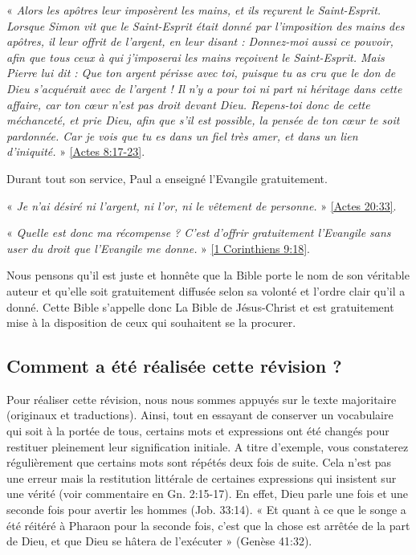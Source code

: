 \begin{small}
« \emph{Alors les apôtres leur imposèrent les mains, et ils reçurent le Saint-Esprit. Lorsque Simon vit que le Saint-Esprit était donné par l'imposition des mains des apôtres, il leur offrit de l'argent, en leur disant : Donnez-moi aussi ce pouvoir, afin que tous ceux à qui j'imposerai les mains reçoivent le Saint-Esprit. Mais Pierre lui dit : Que ton argent périsse avec toi, puisque tu as cru que le don de Dieu s'acquérait avec de l'argent ! Il n'y a pour toi ni part ni héritage dans cette affaire, car ton cœur n'est pas droit devant Dieu. Repens-toi donc de cette méchanceté, et prie Dieu, afin que s'il est possible, la pensée de ton cœur te soit pardonnée. Car je vois que tu es dans un fiel très amer, et dans un lien d'iniquité.} » \vref{Actes 8:17-23}.

Durant tout son service, Paul a enseigné l'Evangile gratuitement.

« \emph{Je n'ai désiré ni l'argent, ni l'or, ni le vêtement de personne.} » \vref{Actes 20:33}.

« \emph{Quelle est donc ma récompense ? C'est d'offrir gratuitement l'Evangile sans user du droit que l'Evangile me donne.} » \vref{1 Corinthiens 9:18}.

Nous pensons qu'il est juste et honnête que la Bible porte le nom de son véritable auteur et qu'elle soit gratuitement diffusée selon sa volonté et l'ordre clair qu'il a donné. Cette Bible s'appelle donc La Bible de Jésus-Christ et est gratuitement mise à la disposition de ceux qui souhaitent se la procurer. 

\subsection*{Comment a été réalisée cette révision ?}

Pour réaliser cette révision, nous nous sommes appuyés sur le texte majoritaire (originaux et traductions). Ainsi, tout en essayant de conserver un vocabulaire qui soit à la portée de tous, certains mots et expressions ont été changés pour restituer pleinement leur signification initiale. A titre d’exemple, vous constaterez régulièrement que certains mots sont répétés deux fois de suite. Cela n’est pas une erreur mais la restitution littérale de certaines expressions qui insistent sur une vérité (voir commentaire en Gn. 2:15-17). En effet, Dieu parle une fois et une seconde fois pour avertir les hommes (Job. 33:14). « Et quant à ce que le songe a été réitéré à Pharaon pour la seconde fois, c’est que la chose est arrêtée de la part de Dieu, et que Dieu se hâtera de l’exécuter » (Genèse 41:32).


\end{small}
